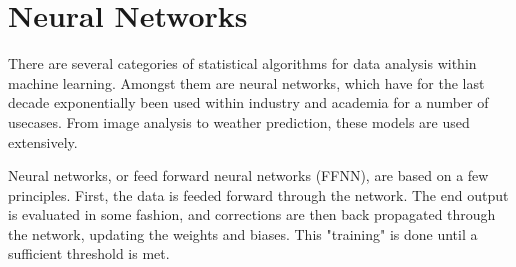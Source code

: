 \chapter*{Neural Networks}
There are several categories of statistical algorithms for data analysis within machine learning.
Amongst them are neural networks, which have for the last decade exponentially been used
within industry and academia for a number of usecases. From image analysis to weather prediction,
these models are used extensively. \par
Neural networks, or feed forward neural networks (FFNN), are based on a few principles.
First, the data is feeded forward through the network. The end output is evaluated in some fashion, 
and corrections are then back propagated through the network, updating the weights and biases. 
This "training" is done until a sufficient threshold is met. 

